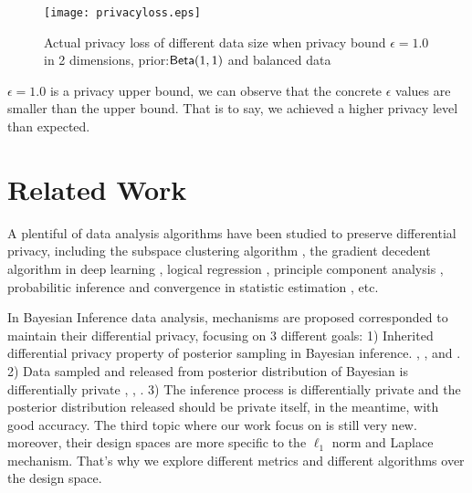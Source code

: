 \documentclass{article}
\begin{document}
\begin{figure}
\begin{center}
\centering
    \texttt{[image: privacyloss.eps]}
\caption{Actual privacy loss of different data size when privacy bound $\epsilon = 1.0$ in 2 dimensions, prior:$\mathsf{Beta}(1,1)$ and balanced data}
\label{fig_privacy}
\end{center}
\end{figure}

$\epsilon = 1.0$ is a privacy upper bound, we can observe that the concrete $\epsilon$ values are smaller than the upper bound. That is to say, we achieved a higher privacy level than expected. 



\section{Related Work}

A plentiful of data analysis algorithms have been studied to preserve differential privacy, including the subspace clustering algorithm \cite{wang2015differentially}, the gradient decedent algorithm in deep learning \cite{abadi2016deep}, logical regression \cite{chaudhuri2009privacy}, principle component analysis \cite{chaudhuri2012near}, probabilitic inference \cite{williams2010probabilistic} and convergence in statistic estimation \cite{chaudhuri2012convergence}, etc. 

In Bayesian Inference data analysis, mechanisms are proposed corresponded to maintain their differential privacy, focusing on 3 different goals: 1) Inherited differential privacy property of posterior sampling in Bayesian inference. \cite{dimitrakakis2014robust}, \cite{zhang2016differential}, \cite{zheng2015differential} and \cite{wang2015privacy}. 2) Data sampled and released from posterior distribution of Bayesian is differentially private \cite{Zhang2017privbayes}, \cite{dimitrakakis2015differential},  \cite{foulds2016theory}. 3) The inference process is differentially private and the posterior distribution released should be private itself, in the meantime, with good accuracy. The third topic where our work focus on is still very new. moreover, their design spaces are more specific to the $\ell_1$ norm and Laplace mechanism. That's why we explore different metrics and different algorithms over the design space.
\end{document}
